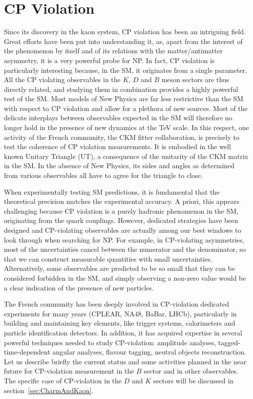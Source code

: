 

\section{CP Violation}
\label{sec:cpv}
Since its discovery in the kaon system, CP violation has been an intriguing field. Great efforts have been put into understanding it, as,  apart from the interest of the phenomenon by itself and of its relations with the matter/antimatter asymmetry, it is a very powerful probe for NP.  In fact,  CP violation is particularly interesting because, in the SM, it originates from a single parameter. All the CP violating observables in the $K$, $D$ and $B$ meson sectors are thus directly related, and studying them in combination provides a highly powerful test of the SM.
Most models of New Physics are far less restrictive than the SM with respect to CP violation and allow for a
plethora of new sources. 
Most of the delicate interplays between observables
expected in the SM will therefore no longer hold in the presence of new dynamics at the TeV scale.
In this respect, one
activity of the French community, the CKM fitter collaboration, is precisely
to test the coherence of CP violation measurements. It is embodied in the well
known Unitary Triangle (UT), a consequence of the unitarity of the CKM matrix
in the SM. In the absence of New Physics, its sides and angles as determined
from various observables all have to agree for the triangle to close.


When experimentally testing SM predictions, it is fundamental that the
theoretical precision matches the experimental accuracy. A priori, this appears
challenging because CP violation is a purely hadronic phenomenon in the SM,
originating from the quark couplings. However, dedicated strategies have been
designed and CP-violating observables are actually among our best windows to look through when searching for  NP. For
example, in CP-violating asymmetries, most of the uncertainties cancel between
the numerator and the denominator, so that we can construct measurable
quantities with small uncertainties. Alternatively, some observables are
predicted to be so small that they can be considered forbidden in the SM, and
simply observing a non-zero value would be a clear indication of the presence of new particles.

The French community has been deeply involved in CP-violation dedicated experiments for
many years (CPLEAR, NA48, BaBar, LHCb), particularly in building and maintaining key
elements, like trigger systems, calorimeters and particle identification detectors. In addition, it has acquired expertise in several powerful techniques needed to study CP-violation: amplitude analyses, tagged-time-dependent
angular analyses, flavour tagging, neutral objects reconstruction.  Let us describe
briefly the current status and some activities planned in the near future for CP-violation measurement in the $B$ sector and in other observables. The specific case of CP-violation in the $D$ and $K$ sectors will be discussed in section~\ref{sec:CharmAndKaon}. 

